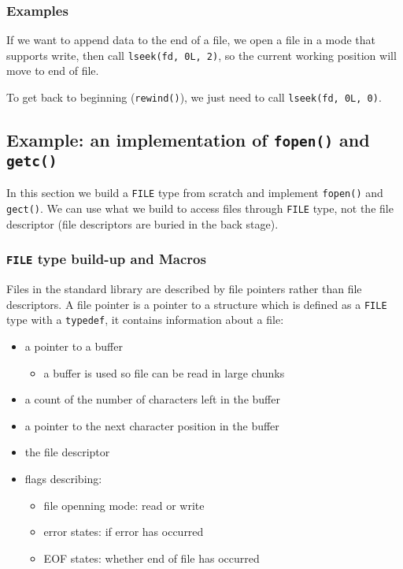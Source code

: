 \documentclass[11pt]{article}
\begin{document}
\subsubsection{Examples}
\label{sec:orgaff272d}
If we want to append data to the end of a file, we open a file in a mode that supports write, then call \texttt{lseek(fd, 0L, 2)}, so the current working position will move to end of file.

To get back to beginning (\texttt{rewind()}), we just need to call \texttt{lseek(fd, 0L, 0)}.
\subsection{Example: an implementation of \texttt{fopen()} and \texttt{getc()}}
\label{sec:orgb19ac6b}
In this section we build a \texttt{FILE} type from scratch and implement \texttt{fopen()} and \texttt{gect()}. We can use what we build to access files through \texttt{FILE} type, not the file descriptor (file descriptors are buried in the back stage).

\subsubsection{\texttt{FILE} type build-up and Macros}
\label{sec:org5d543f1}
Files in the standard library are described by file pointers rather than file descriptors. A file pointer is a pointer to a structure which is defined as a \texttt{FILE} type with a \texttt{typedef}, it contains information about a file:
\begin{itemize}
\item a pointer to a buffer
\begin{itemize}
\item a buffer is used so file can be read in large chunks
\end{itemize}
\item a count of the number of characters left in the buffer
\item a pointer to the next character position in the buffer
\item the file descriptor
\item flags describing:
\begin{itemize}
\item file openning mode: read or write
\item error states: if error has occurred
\item EOF states: whether end of file has occurred
\end{itemize}
\end{itemize}
\end{document}
